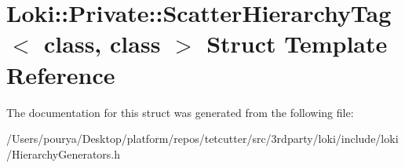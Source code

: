 \hypertarget{structLoki_1_1Private_1_1ScatterHierarchyTag}{}\section{Loki\+:\+:Private\+:\+:Scatter\+Hierarchy\+Tag$<$ class, class $>$ Struct Template Reference}
\label{structLoki_1_1Private_1_1ScatterHierarchyTag}


The documentation for this struct was generated from the following file\+:\begin{DoxyCompactItemize}
\item 
/\+Users/pourya/\+Desktop/platform/repos/tetcutter/src/3rdparty/loki/include/loki/Hierarchy\+Generators.\+h\end{DoxyCompactItemize}
